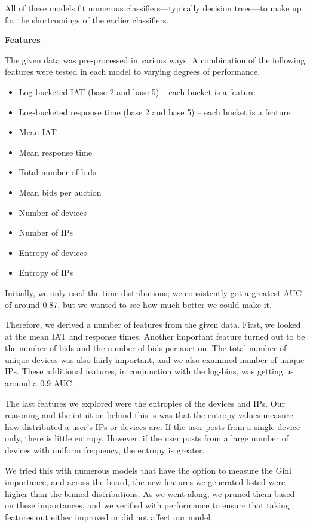 \documentclass{article} %
\begin{document}
All of these models fit numerous classifiers---typically decision trees---to make up for the shortcomings of the earlier classifiers.

\textbf{Features}

The given data was pre-processed in various ways.
A combination of the following features were tested in each model to varying degrees of performance.

\begin{itemize}
\item Log-bucketed IAT (base 2 and base 5) -- each bucket is a feature
\item Log-bucketed response time (base 2 and base 5) -- each bucket is a feature
\item Mean IAT
\item Mean response time
\item Total number of bids
\item Mean bids per auction
\item Number of devices
\item Number of IPs
\item Entropy of devices
\item Entropy of IPs
\end{itemize}

Initially, we only used the time distributions; we consistently got a greatest AUC of around 0.87, but we wanted to see how much better we could make it.

Therefore, we derived a number of features from the given data.
First, we looked at the mean IAT and response times.
Another important feature turned out to be the number of bids and the number of bids per auction.
The total number of unique devices was also fairly important, and we also examined number of unique IPs.
These additional features, in conjunction with the log-bins, was getting us around a 0.9 AUC.

The last features we explored were the entropies of the devices and IPs.
Our reasoning and the intuition behind this is was that the entropy values measure how distributed a user's IPs or devices are.
If the user posts from a single device only, there is little entropy.
However, if the user posts from a large number of devices with uniform frequency, the entropy is greater.

We tried this with numerous models that have the option to measure the Gini importance, and across the board, the new features we generated listed were higher than the binned distributions.
As we went along, we pruned them based on these importances, and we verified with performance to ensure that taking features out either improved or did not affect our model.
\end{document}
